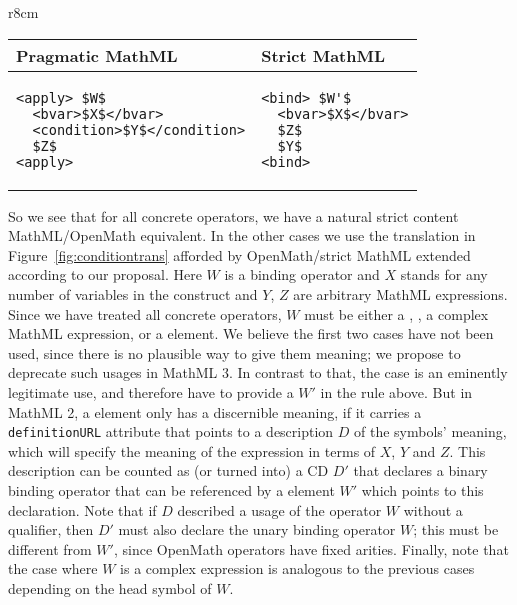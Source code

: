 \documentclass{llncs}
\begin{document}
\begin{wrapfigure}r{8cm}\centering\vspace*{-2em}
\lstset{language=MathML2,mathescape,frame=none,numbers=none}
\lstset{aboveskip=-.7em,belowskip=-1.2em}
\begin{tabular}{|p{4.3cm}|p{3cm}|}\hline
  Pragmatic MathML & Strict MathML\\\hline\hline
\begin{lstlisting}
<apply> $W$
  <bvar>$X$</bvar>
  <condition>$Y$</condition>
  $Z$
<apply>
\end{lstlisting}
& 
\begin{lstlisting}[language=MathML2]
<bind> $W'$
  <bvar>$X$</bvar>
  $Z$
  $Y$
<bind>
\end{lstlisting}\\\hline
\end{tabular}
\caption{Translating MathML with {}}\label{fig:conditiontrans}\vspace*{-2em}
\end{wrapfigure}
So we see that for all concrete operators, we have a natural strict content
MathML/OpenMath equivalent. In the other cases we use the translation in
Figure~\ref{fig:conditiontrans} afforded by OpenMath/strict MathML extended according to
our proposal. Here $W$ is a binding operator and $X$ stands for any number of variables in
the {} construct and $Y$, $Z$ are arbitrary MathML expressions. Since we
have treated all concrete operators, $W$ must be either a {}, {},
a complex MathML expression, or a {} element. We believe the
first two cases have not been used, since there is no plausible way to give them meaning;
we propose to deprecate such usages in MathML 3. In contrast to that, the
{} case is an eminently legitimate use, and therefore have to provide a
$W'$ in the rule above. But in MathML 2, a {} element only has a
discernible meaning, if it carries a {\texttt{definitionURL}} attribute that points to a
description $D$ of the symbols' meaning, which will specify the meaning of the expression
in terms of $X$, $Y$ and $Z$. This description can be counted as (or turned into) a CD
$D'$ that declares a binary binding operator that can be referenced by a
{} element $W'$ which points to this declaration. Note that if $D$
described a usage of the operator $W$ without a {} qualifier, then $D'$
must also declare the unary binding operator $W$; this must be different from $W'$, since
OpenMath operators have fixed arities. Finally, note that the case where $W$
is a complex expression is analogous to the previous cases depending on the head symbol of
$W$.\iffull{}\fi
\end{document}
